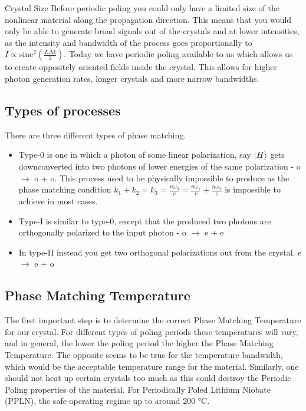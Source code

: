 \documentclass{article}
\theoremstyle{mytheoremstyle}
\theoremstyle{mytheoremstyle}
\theoremstyle{myproblemstyle}
\begin{document}
\par{Crystal Size}
Before periodic poling you could only have a limited size of the nonlinear material along the propagation direction.
This means that you would only be able to generate broad signals out of the crystals and at lower intensities, as the
intensity and bandwidth of the process goes proportionally to $I \propto \text{sinc}^2\left(\frac{L \Delta k}{2}\right)$.
Today we have periodic poling available to us which allows us to create oppositely oriented fields inside the
crystal. This allows for higher photon generation rates, longer crystals and more narrow bandwidths.

\subsection{Types of processes}
There are three different types of phase matching.
\begin{itemize}
	\item Type-0 is one in which a photon of some linear polarization, say $\ket{H}$ gets downconverted
into two photons of lower energies of the same polarization - o $\rightarrow$ o + o. This process used to be physically impossible to produce
as the phase matching condition $k_1 + k_2 = k_3 = \frac{n \omega_3}{c} = \frac{n \omega_1}{c} + \frac{n \omega_2}{c}$ is impossible to achieve
in most cases.
	\item Type-I is similar to type-0, except that the produced two photons are orthogonally polarized to the input photon - o $\rightarrow$ e + e
	\item In type-II instead you get two orthogonal polarizations out from the crystal. e $\rightarrow$ e + o
\end{itemize}

\subsection{Phase Matching Temperature}
The first important step is to determine the correct Phase Matching Temperature for our crystal. For different types of poling
periods these temperatures will vary, and in general, the lower the poling period the higher the Phase Matching Temperature.
The opposite seems to be true for the temperature bandwidth, which would be the acceptable temperature range for the material.
Similarly, one should not heat up certain crystals too much as this could destroy the Periodic Poling properties of the material.
For Periodically Poled Lithium Niobate (PPLN), the safe operating regime up to around 200 °C.
\end{document}
